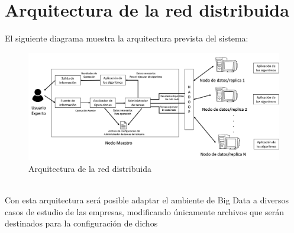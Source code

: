 \section{Arquitectura de la red distribuida}
El siguiente diagrama muestra la arquitectura prevista del sistema:
\begin{figure}[!htbp]
	\hypertarget{fig:cap1}{\hspace{1pt}}
	\begin{center}
		\includegraphics[height=0.3\textheight]{capitulo1/images/im1.png}
		\caption{Arquitectura de la red distribuida}
		\label{fig:cap1}
	\end{center}
\end{figure}
\\ 
Con esta arquitectura será posible adaptar el ambiente de Big Data a diversos casos de estudio de las empresas, modificando únicamente archivos que serán destinados para la configuración de dichos

